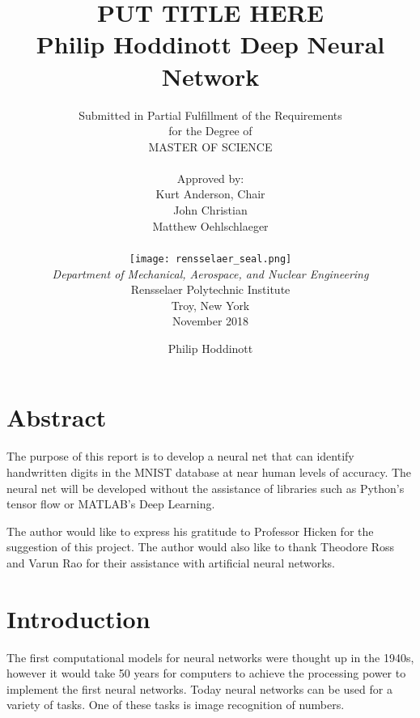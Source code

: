 \documentclass[12pt]{article}
\title{ 
		\LARGE \textbf{\uppercase{Put Title Here}} \\
		\vspace{0.25cm}
		\LARGE \textbf{Philip Hoddinott}
	}
\author{\small{Submitted in Partial Fulfillment of the Requirements} \\ \small{for the Degree of} \\
		\uppercase{Master of Science} \\ \\
		Approved by:
		\\ Kurt Anderson, Chair \\ John Christian \\ Matthew Oehlschlaeger \\ \\ %
		\texttt{[image: rensselaer\_seal.png]} \\
		\small{\textit{Department of Mechanical, Aerospace, and Nuclear Engineering}} \\
		\small{Rensselaer Polytechnic Institute} \\ 
		\small{Troy, New York} \\
		\small{November 2018}
	}
\begin{document}
	\clearpage
		\title{Deep Neural Network}
	\author{Philip Hoddinott}
	
	\maketitle


	


	
	



	
\tableofcontents
\listoffigures	
	\newpage
	\section*{Abstract}
	The purpose of this report is to develop a neural net that can identify handwritten digits in the MNIST database at near human levels of accuracy. The neural net will be developed without the assistance of libraries such as Python's tensor flow or MATLAB's Deep Learning.\par 
	The author would like to express his gratitude to Professor Hicken for the suggestion of this project. The author would also like to thank Theodore Ross and Varun Rao for their assistance with artificial neural networks.
	



	\section{Introduction}
	The first computational models for neural networks were thought up in the 1940s, however it would take 50 years for computers to achieve the processing power to implement the first neural networks. Today neural networks can be used for a variety of tasks. One of these tasks is image recognition of numbers. 
\end{document}
